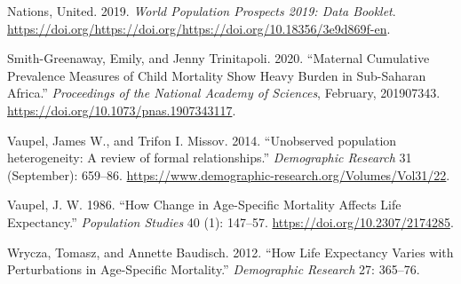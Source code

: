 \documentclass[
]{article}
\begin{document}
\leavevmode\hypertarget{ref-WPP19}{}%
Nations, United. 2019. \emph{World Population Prospects 2019: Data
Booklet}.
\url{https://doi.org/https://doi.org/https://doi.org/10.18356/3e9d869f-en}.

\leavevmode\hypertarget{ref-smith-greenaway_maternal_2020}{}%
Smith-Greenaway, Emily, and Jenny Trinitapoli. 2020. ``Maternal
Cumulative Prevalence Measures of Child Mortality Show Heavy Burden in
Sub-Saharan Africa.'' \emph{Proceedings of the National Academy of
Sciences}, February, 201907343.
\url{https://doi.org/10.1073/pnas.1907343117}.

\leavevmode\hypertarget{ref-Vaupel2014}{}%
Vaupel, James W., and Trifon I. Missov. 2014. ``Unobserved population
heterogeneity: A review of formal relationships.'' \emph{Demographic
Research} 31 (September): 659--86.
\url{https://www.demographic-research.org/Volumes/Vol31/22}.

\leavevmode\hypertarget{ref-Vaupel1986}{}%
Vaupel, J. W. 1986. ``How Change in Age-Specific Mortality Affects Life
Expectancy.'' \emph{Population Studies} 40 (1): 147--57.
\url{https://doi.org/10.2307/2174285}.

\leavevmode\hypertarget{ref-wrycza2012}{}%
Wrycza, Tomasz, and Annette Baudisch. 2012. ``How Life Expectancy Varies
with Perturbations in Age-Specific Mortality.'' \emph{Demographic
Research} 27: 365--76.
\end{document}
